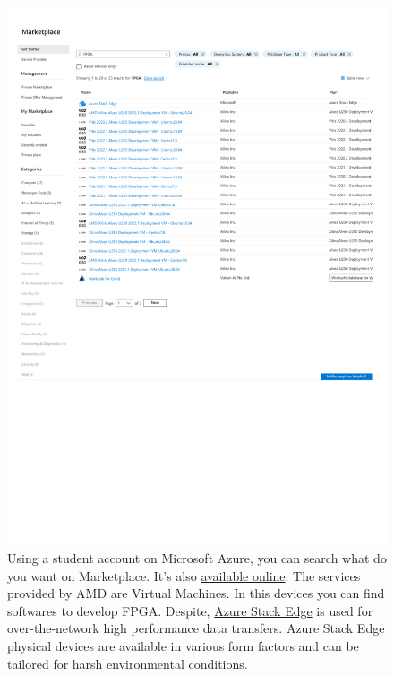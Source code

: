 \documentclass[a4paper]{article}
\begin{document}
    \begin{figure}[!htp]
        \centering
        \includegraphics[width=\textwidth]{img/Marketplace FPGA - Microsoft Azure.pdf}
        \caption{Using a student account on Microsoft Azure, you can search what do you want on Marketplace. It's also \href{https://azuremarketplace.microsoft.com/en/marketplace/apps?search=fpga&page=1}{available online}. The services provided by AMD are Virtual Machines. In this devices you can find softwares to develop FPGA. Despite, \href{https://azuremarketplace.microsoft.com/en/marketplace/apps/Microsoft.DataBoxEdge?tab=Overview}{Azure Stack Edge} is used for over-the-network high performance data transfers. Azure Stack Edge physical devices are available in various form factors and can be tailored for harsh environmental conditions.}
    \end{figure}
\end{document}
